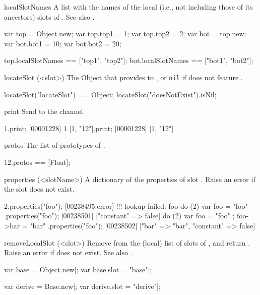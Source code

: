 \begin{urbiscriptapi}
\item[localSlotNames]%
  A list with the names of the local (i.e., not including those of its
  ancestors) slots of \this.  See also .
\begin{urbiassert}
var top = Object.new;
var top.top1 = 1;
var top.top2 = 2;
var bot = top.new;
var bot.bot1 = 10;
var bot.bot2 = 20;

top.localSlotNames == ["top1", "top2"];
bot.localSlotNames == ["bot1", "bot2"];
\end{urbiassert}

\item[locateSlot](<slot>)%
  The Object that provides  to \this, or \lstinline|nil| if \this
  does not feature .
\begin{urbiassert}
locateSlot("locateSlot") == Object;
locateSlot("doesNotExist").isNil;
\end{urbiassert}

\item[print] Send \this to the  channel.
\begin{urbiscript}
1.print;
[00001228] 1
[1, "12"].print;
[00001228] [1, "12"]
\end{urbiscript}

\item[protos]
  The list of prototypes of \this.
\begin{urbiassert}
12.protos == [Float];
\end{urbiassert}

\item[properties](<slotName>)%
  A dictionary of the properties of slot .  Raise an error if
  the slot does not exist.
\begin{urbiscript}
2.properties("foo");
[00238495:error] !!! lookup failed: foo
do (2) { var foo = "foo" }.properties("foo");
[00238501] ["constant" => false]
do (2) { var foo = "foo" ; foo->bar = "bar" }.properties("foo");
[00238502] ["bar" => "bar", "constant" => false]
\end{urbiscript}

\item[removeLocalSlot](<slot>)%
  Remove  from the (local) list of slots of \this, and return
  \this.  Raise an error if  does not exist.  See also
  .
\begin{urbiscript}
var base = Object.new|;
var base.slot = "base"|;

var derive = Base.new|;
var derive.slot = "derive"|;


\end{urbiscript}
\end{urbiscriptapi}
